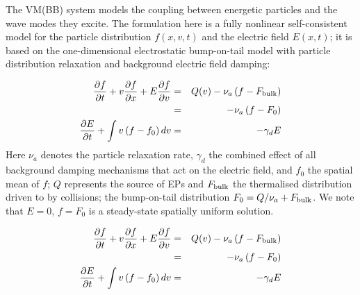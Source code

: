 \documentclass{article}
\begin{document}
The VM(BB) system models the coupling between energetic particles and the wave modes they excite.
The formulation here is a fully nonlinear self-consistent model for the particle distribution $f(x,v,t)$ and the electric field $E(x,t)$; it is based on the one-dimensional electrostatic bump-on-tail model with particle distribution relaxation and background electric field damping:

\begin{eqnarray}
\label{MVE2}
	\frac{\partial f}{\partial t} + v \frac{\partial f}{\partial x} + E \frac{\partial f}{\partial v} & = &
		Q(v) - \nu_a \left( f - F_{\rm bulk} \right) \\
		& = & - \nu_a \left( f - F_0 \right)         \\
\label{MDCE2}
	\frac{\partial E}{\partial t} + \int v \left( f - f_0 \right) dv & = & - \gamma_d E
\end{eqnarray}
%
Here $\nu_a$ denotes the particle relaxation rate, $\gamma_d$ the combined effect of all background damping mechanisms that act on the electric field, and $f_0$ the spatial mean of $f$; $Q$ represents the source of EPs and $F_{\rm bulk}$ the thermalised distribution driven to by collisions; the bump-on-tail distribution $F_0 = Q / \nu_a + F_{\rm bulk}$.
We note that $E = 0$, $f = F_0$ is a steady-state spatially uniform solution.

\begin{eqnarray}
\label{MVE2}
	\frac{\partial f}{\partial t} + v \frac{\partial f}{\partial x} + E \frac{\partial f}{\partial v} & = &
		Q(v) - \nu_a \left( f - F_{\rm bulk} \right) \\
		& = & - \nu_a \left( f - F_0 \right)         \\
\label{MDCE2}
	\frac{\partial E}{\partial t} + \int v \left( f - f_0 \right) dv & = & - \gamma_d E
\end{eqnarray}
%
\end{document}
